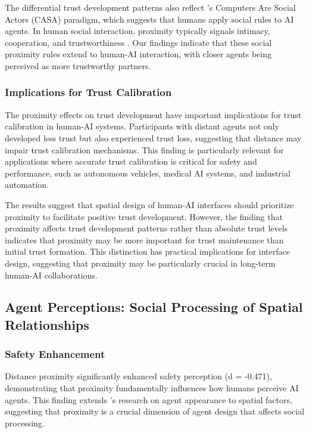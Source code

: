 \documentclass[12pt]{article}
\begin{document}
The differential trust development patterns also reflect \citeauthor{nass2000machines}'s \citeyear{nass2000machines} Computers Are Social Actors (CASA) paradigm, which suggests that humans apply social rules to AI agents. In human social interaction, proximity typically signals intimacy, cooperation, and trustworthiness \citep{burgoon1991interpersonal}. Our findings indicate that these social proximity rules extend to human-AI interaction, with closer agents being perceived as more trustworthy partners.

\subsubsection{Implications for Trust Calibration}

The proximity effects on trust development have important implications for trust calibration in human-AI systems. Participants with distant agents not only developed less trust but also experienced trust loss, suggesting that distance may impair trust calibration mechanisms. This finding is particularly relevant for applications where accurate trust calibration is critical for safety and performance, such as autonomous vehicles, medical AI systems, and industrial automation.

The results suggest that spatial design of human-AI interfaces should prioritize proximity to facilitate positive trust development. However, the finding that proximity affects trust development patterns rather than absolute trust levels indicates that proximity may be more important for trust maintenance than initial trust formation. This distinction has practical implications for interface design, suggesting that proximity may be particularly crucial in long-term human-AI collaborations.


\subsection{Agent Perceptions: Social Processing of Spatial Relationships}

\subsubsection{Safety Enhancement}

Distance proximity significantly enhanced safety perception (d = -0.471), demonstrating that proximity fundamentally influences how humans perceive AI agents. This finding extends \citeauthor{hess2009effects}'s \citeyear{hess2009effects} research on agent appearance to spatial factors, suggesting that proximity is a crucial dimension of agent design that affects social processing.
\end{document}
